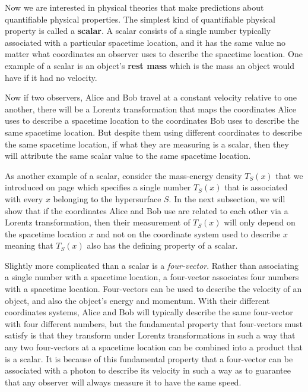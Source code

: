\documentclass[12pt]{report}
\begin{document}
Now we are interested in physical theories that make predictions about quantifiable physical properties. The simplest kind of quantifiable physical property is called a \textbf{scalar}.  A scalar consists of a single number typically associated with a particular spacetime location, and it has the same value no matter what coordinates an observer uses to describe the spacetime location. One example of a scalar is an object's \textbf{rest mass} which is the mass an object would have if it had no velocity. 

Now if two observers, Alice and Bob travel at a constant velocity relative to one another, there will be a Lorentz transformation that maps the coordinates Alice uses to describe a spacetime location to the coordinates  Bob uses to describe the same spacetime location.  But despite them using different coordinates to describe the same spacetime location, if what they are measuring is a scalar, then they will attribute the same scalar value to the same spacetime location.

As another example of a scalar, consider the mass-energy density $T_S(x)$ that we introduced on page \pageref{massenergydensity} which specifies a single number $T_S(x)$ that is associated with every $x$ belonging to the hypersurface $S$. In the next subsection, we will show that if the coordinates Alice and Bob use are related to each other via a Lorentz transformation, then their measurement of $T_S(x)$ will only depend on the spacetime location $x$ and not on the coordinate system used to describe $x$ meaning that $T_S(x)$ also has the defining property of a scalar.

Slightly more complicated than a scalar is a \emph{four-vector}. Rather than associating a single number with a spacetime location, a four-vector associates four numbers with a spacetime location. Four-vectors can be used to describe the velocity of an object, and also the object's energy and momentum. With their different coordinates systems, Alice and Bob will typically describe the same four-vector with four different numbers, but the fundamental property that four-vectors must satisfy is that they transform under Lorentz transformations in such a way that any two four-vectors at a spacetime location can be combined into a product that is a scalar. It is because of this fundamental property that a four-vector can be associated with a photon to describe its velocity in such a way as to guarantee that any observer will always measure it to have the same speed.
\end{document}
